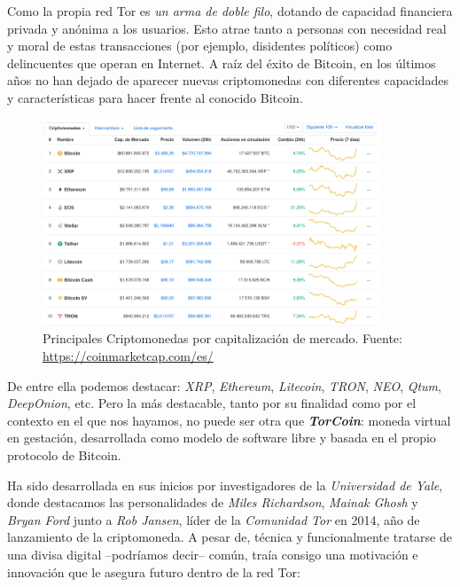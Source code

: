 \documentclass[a4paper, 11pt, titlepage]{article}
\begin{document}
        Como la propia red Tor es \emph{un arma de doble filo}, dotando de capacidad financiera privada y anónima a los 
        usuarios. Esto atrae tanto a personas con necesidad real y moral de estas transacciones (por ejemplo, disidentes 
        políticos) como delincuentes que operan en Internet. A raíz del éxito de Bitcoin, en los últimos años no han dejado 
        de aparecer nuevas criptomonedas con diferentes capacidades y características para hacer frente al conocido Bitcoin.
        
        \begin{figure}[htp]
            \centering
            \includegraphics[width=0.9\textwidth]{resources/criptomonedas01.png}
            \caption{Principales Criptomonedas por capitalización de mercado. Fuente: \underline{https://coinmarketcap.com/es/}}
            \label{}
        \end{figure}
        
        De entre ella podemos destacar: \emph{XRP}, \emph{Ethereum}, \emph{Litecoin}, \emph{TRON}, \emph{NEO}, \emph{Qtum}, 
        \emph{DeepOnion}, etc. Pero la más destacable, tanto por su finalidad como por el contexto en el que nos hayamos, no 
        puede ser otra que \emph{\textbf{TorCoin}}: moneda virtual en gestación, desarrollada como modelo de software libre y 
        basada en el propio protocolo de Bitcoin.
        
        Ha sido desarrollada en sus inicios por investigadores de la \emph{Universidad de Yale}, donde destacamos las 
        personalidades de \emph{Miles Richardson}, \emph{Mainak Ghosh} y \emph{Bryan Ford} junto a \emph{Rob Jansen}, 
        líder de la \emph{Comunidad Tor} en 2014, año de lanzamiento de la criptomoneda. A pesar de, técnica y funcionalmente 
        tratarse de una divisa digital --podríamos decir-- común, traía consigo una motivación e innovación que le asegura 
        futuro dentro de la red Tor: 
        
\end{document}
